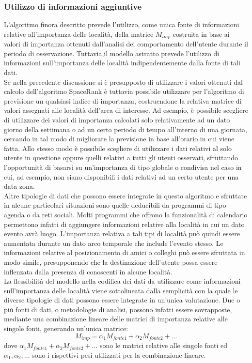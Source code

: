\subsubsection{Utilizzo di informazioni aggiuntive}
L'algoritmo finora descritto prevede l'utilizzo, come unica fonte di informazioni
relative all'importanza delle localit\`a, della matrice $M_{imp}$ costruita in base ai
valori di importanza ottenuti dall'analisi dei comportamento dell'utente durante
il periodo di osservazione. Tuttavia,il modello astratto prevede l'utilizzo
di informazioni sull'importanza delle localit\`a indipendentemente dalla fonte di
tali dati.\\
Se nella precedente discussione si \`e presupposto di utilizzare i valori ottenuti
dal calcolo dell'algoritmo SpaceRank \`e tuttavia possibile utilizzare per
l'algoritmo di previsione un qualsiasi indice di importanza, costruendone la
relativa matrice di valori assegnati alle localit\`a dell'area di interesse. Ad esempio,
\`e possibile scegliere di utilizzare dei valori di importanza calcolati solo
relativamente ad un dato giorno della settimana o ad un certo periodo di tempo
all'interno di una giornata, cercando in tal modo di migliorare la previsione
in base all'orario in cui viene fatta. Allo stesso modo \`e possibile scegliere di
utilizzare i dati relativi al solo utente in questione oppure quelli relativi a tutti
gli utenti osservati, sfruttando l'opportunit\`a di basarsi su un'importanza di
tipo globale o condivisa nel caso in cui, ad esempio, non siano disponibili i
dati relativi ad un certo utente per una data zona.\\
Altre tipologie di dati che possono essere integrate in questo algoritmo e
sfruttate in alcune particolari situazioni sono quelle deducibili da programmi
di tipo agenda o da reti sociali. Molti programmi che offrono la funzionalit\`a di
calendario permettono infatti di aggiungere informazioni relative alla localit\`a in
cui un dato evento avr\`a luogo. L'importanza relativa a tali tipi di localit\`a pu\`o
quindi essere aumentata durante un dato arco temporale che include l'evento
stesso. Le informazioni relative al posizionamento di amici o colleghi pu\`o essere
sfruttata in modo simile, presupponendo che la destinazione dell'utente possa
essere inflenzata dalla presenza di conoscenti in alcune localit\`a.\\
La flessibilit\`a del modello nella codifica dei dati da utilizzare come informazioni
sull'importanza delle localit\`a viene sottolineata dalla semplicit\`a con
la quale le diverse tipologie di dati possono essere integrate in un'unica valutazione.
Due o pi\`u fonti di dati, o metodologie di analisi, possono infatti essere
sovrapposte, mediante una combinazione lineare delle matrici di importanza
relative alle singole fonti, generando un'unica matrice:
\begin{equation}
M_{imp} = \alpha_{1}M_{fonte1} + \alpha_{2}M_{fonte2} + \dots
\end{equation}
dove $\alpha_{1}M_{fonte1} + \alpha_{2}M_{fonte2} + \dots$ sono le matrici relative
alle singole fonti ed $\alpha_{1},\alpha_{2},\dots$
sono i rispettivi pesi utilizzati per la combinazione lineare.
